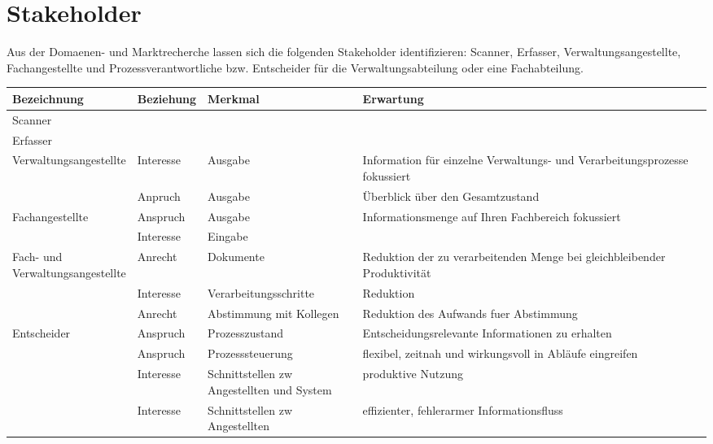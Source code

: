 \documentclass[11pt,oneside,a4paper,notitlepage]{article}
\begin{document}
\section{Stakeholder}

Aus der Domaenen- und Marktrecherche lassen sich die folgenden Stakeholder identifizieren: Scanner, Erfasser, Verwaltungsangestellte, Fachangestellte und Prozessverantwortliche bzw. Entscheider für die Verwaltungsabteilung oder eine Fachabteilung.\\

\begin{center}
\begin{tabular}{| l | l | l | p{5cm} |}
\hline
Bezeichnung & Beziehung & Merkmal & Erwartung \\
\hline 
Scanner & & & \\
\hline 
Erfasser & & & \\
\hline
Verwaltungsangestellte & Interesse & Ausgabe &
 Information für einzelne Verwaltungs- und Verarbeitungsprozesse fokussiert\\
%
 & Anpruch & Ausgabe & 
 Überblick über den Gesamtzustand\\
%
\hline
Fachangestellte & Anspruch & Ausgabe &
 Informationsmenge auf Ihren Fachbereich fokussiert\\
  & Interesse & Eingabe &
  \\
%
\hline
\parbox[t]{3cm}{Fach- und\\Verwaltungsangestellte} & Anrecht & Dokumente &
 Reduktion der zu verarbeitenden Menge bei gleichbleibender Produktivität\\
 & Interesse & Verarbeitungsschritte &
 Reduktion\\
 & Anrecht & Abstimmung mit Kollegen &
 Reduktion des Aufwands fuer Abstimmung \\
%
\hline
Entscheider  &	Anspruch		&	Prozesszustand	&
Entscheidungsrelevante Informationen zu erhalten\\
%
 			& Anspruch & Prozesssteuerung &
flexibel, zeitnah und wirkungsvoll in Abläufe eingreifen\\
%
 & Interesse & \parbox[t]{4cm}{Schnittstellen zw\\Angestellten und System} & 
produktive Nutzung\\
 & Interesse & Schnittstellen zw Angestellten &
 effizienter, fehlerarmer Informationsfluss\\
%
\hline

\end{tabular}

\end{center}
\end{document}
